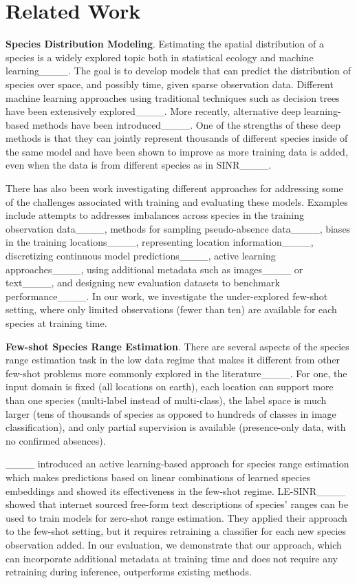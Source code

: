 \section{Related Work}
\vspace{-5pt}
{\bf Species Distribution Modeling}. 
Estimating the spatial distribution of a species is a widely explored topic both in statistical ecology and machine learning____. 
The goal is to develop models that can predict the  distribution of species over space, and possibly time, given sparse observation data. 
Different machine learning approaches using traditional techniques such as decision trees have been extensively explored____. 
More recently, alternative deep learning-based methods have been introduced____. 
One of the strengths of these deep methods is that they can jointly represent thousands of different species inside of the same model and have been shown to improve as more training data is added, even when the data is from different species as in SINR____. 

There has also been work investigating different approaches for addressing some of the challenges associated with training and evaluating these models.  
Examples include attempts to addresses imbalances across species in the training observation data____, methods for sampling pseudo-absence data____, biases in the training locations____, representing location information____, discretizing continuous model predictions____, active learning approaches____, using additional metadata such as images____ or text____, and designing new evaluation datasets to benchmark performance____. 
In our work, we investigate the under-explored few-shot setting, where only limited observations (\eg fewer than ten) are available for each species at training time.

{\bf Few-shot Species Range Estimation}. 
There are several aspects of the species range estimation task in the low data regime that makes it different from other few-shot problems more commonly explored in the literature____. 
For one, the input domain is fixed (\ie all locations on earth), each location can support more than one species (\ie multi-label instead of multi-class), the label space is much larger (\ie tens of thousands of species as opposed to hundreds of classes in image classification), and only partial supervision is available (\eg presence-only data, with no confirmed absences). 

____ introduced an active learning-based approach for species range estimation which makes predictions based on linear combinations of learned species embeddings and showed its effectiveness in the few-shot regime. 
LE-SINR____ showed that internet sourced free-form text descriptions of species' ranges can be used to train models for zero-shot range estimation. 
They applied their approach to the few-shot setting, but it requires retraining a classifier for each new species observation added. 
In our evaluation, we demonstrate that our \modelname approach, which can incorporate additional metadata at training time and does not require any retraining during inference, outperforms existing methods.  



\vspace{-8pt}